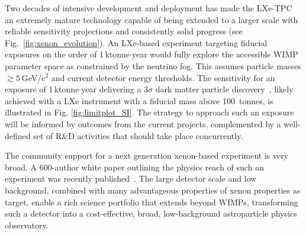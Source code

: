 Two decades of intensive development and deployment has made the LXe-TPC an extremely mature technology capable of being extended to a larger scale with reliable sensitivity projections and consistently solid progress (see Fig.~\ref{fig:xenon_evolution}). 
An LXe-based experiment targeting fiducial exposures on the order of 1\,ktonne$\cdot$year would fully explore the accessible WIMP parameter space as constrained by the neutrino fog. This assumes particle masses $\gtrsim 5~$GeV/c$^2$ and current detector energy thresholds. The sensitivity for an exposure of 1\,ktonne$\cdot$year delivering a $3\sigma$ dark matter particle discovery~\cite{Aalbers:2022dzr}, likely achieved with a LXe instrument with a fiducial mass above 100~tonnes, is illustrated in Fig. \ref{fig:limitplot_SI}. 
The strategy to approach such an exposure will be informed by outcomes from the current projects, complemented by a well-defined set of R\&D activities that should take place concurrently. 


The community support for a next generation xenon-based experiment is very broad. A 600-author white paper outlining the physics reach of such an experiment was recently published~\cite{Aalbers:2022dzr}. The large detector scale and low background, combined with many advantageous properties of xenon properties as target, enable a rich science portfolio that extends beyond WIMPs, transforming such a detector into a cost-effective, broad, low-background astroparticle physics observatory. 
